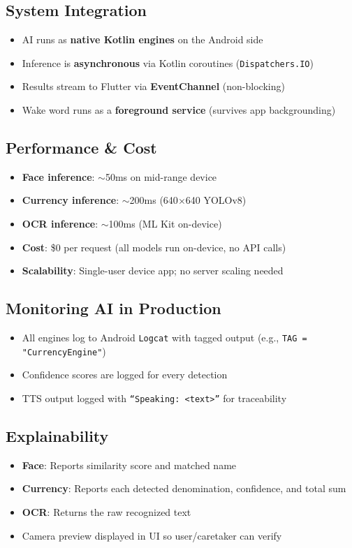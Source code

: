 \documentclass[12pt,a4paper]{article}
\begin{document}
\subsection{System Integration}
\begin{itemize}
  \item AI runs as \textbf{native Kotlin engines} on the Android side
  \item Inference is \textbf{asynchronous} via Kotlin coroutines (\texttt{Dispatchers.IO})
  \item Results stream to Flutter via \textbf{EventChannel} (non-blocking)
  \item Wake word runs as a \textbf{foreground service} (survives app backgrounding)
\end{itemize}

\subsection{Performance \& Cost}
\begin{itemize}
  \item \textbf{Face inference}: $\sim$50ms on mid-range device
  \item \textbf{Currency inference}: $\sim$200ms (640$\times$640 YOLOv8)
  \item \textbf{OCR inference}: $\sim$100ms (ML Kit on-device)
  \item \textbf{Cost}: \$0 per request (all models run on-device, no API calls)
  \item \textbf{Scalability}: Single-user device app; no server scaling needed
\end{itemize}

\subsection{Monitoring AI in Production}
\begin{itemize}
  \item All engines log to Android \texttt{Logcat} with tagged output (e.g., \texttt{TAG = "CurrencyEngine"})
  \item Confidence scores are logged for every detection
  \item TTS output logged with \texttt{``Speaking: <text>''} for traceability
\end{itemize}

\subsection{Explainability}
\begin{itemize}
  \item \textbf{Face}: Reports similarity score and matched name
  \item \textbf{Currency}: Reports each detected denomination, confidence, and total sum
  \item \textbf{OCR}: Returns the raw recognized text
  \item Camera preview displayed in UI so user/caretaker can verify
\end{itemize}
\end{document}
